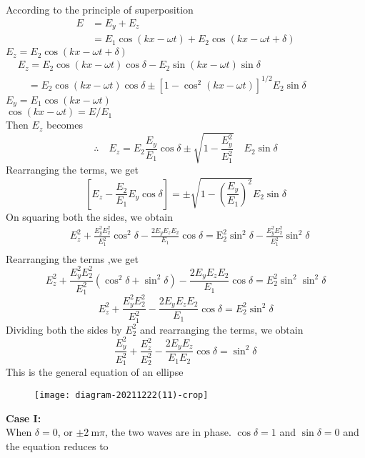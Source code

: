  According to the principle of superposition
 $$
 \begin{aligned}
 E &=E_{y}+E_{z} \\
 &=E_{1} \cos (k x-\omega t)+E_{2} \cos (k x-\omega t+\delta)
 \end{aligned}
 $$
 $E_{z}=E_{2} \cos (k x-\omega t+\delta)$\\
 $\begin{aligned}
 	&E_{z}=E_{2} \cos (k x-\omega t) \cos \delta-E_{2} \sin (k x-\omega t) \sin \delta \\
 	&\quad=E_{2} \cos (k x-\omega t) \cos \delta \pm\left[1-\cos ^{2}(k x-\omega t)\right]^{1 / 2} E_{2} \sin \delta
 \end{aligned}$\\
 $E_{y}=E_{1} \cos (k x-\omega t)$\\
$ \cos (k x-\omega t)=E / E_{1}$\\
Then $E_z$ becomes\\
$$\therefore \quad E_{z}=E_{2} \frac{E_{y}}{E_{1}} \cos \delta \pm \sqrt{1-\frac{E_{y}^{2}}{E_{1}^{2}}} \quad E_{2} \sin \delta$$
Rearranging the terms, we get
$$
\left[E_{z}-\frac{E_{2}}{E_{1}} E_{y} \cos \delta\right]=\pm \sqrt{1-\left(\frac{E_{y}}{E_{1}}\right)^{2}} E_{2} \sin \delta
$$
On squaring both the sides, we obtain
$$
\begin{aligned}
&E_{z}^{2}+\frac{E_{y}^{2} E_{2}^{2}}{E_{1}^{2}} \cos ^{2} \delta-\frac{2 E_{y} E_{z} E_{2}}{E_{1}} \cos \delta=\mathrm{E}_{2}^{2} \sin ^{2} \delta-\frac{E_{y}^{2} E_{2}^{2}}{E_{1}^{2}} \sin ^{2} \delta \\
\end{aligned}
$$
Rearranging the terms ,we get
$$E_z^2+\frac{E_y^2E_2^2}{E_1^2}\left( \cos^2\delta+\sin^2\delta\right) -\frac{2E_yE_zE_2}{E_1}\cos\delta=E_2^2\sin^2\sin^2\delta$$
$$E_{z}^{2}+\frac{E_{y}^{2} E_{2}^{2}}{E_{1}^{2}}-\frac{2 E_{y} E_{z} E_{2}}{E_{1}} \cos \delta=E_{2}^{2} \sin ^{2} \delta$$
Dividing both the sides by $E_{2}^{2}$ and rearranging the terms, we obtain
$$
\frac{E_{y}^{2}}{E_{1}^{2}}+\frac{E_{z}^{2}}{E_{2}^{2}}-\frac{2 E_{y} E_{z}}{E_{1} E_{2}} \cos \delta=\sin ^{2} \delta
$$
This is the general equation of an ellipse\\
\begin{figure}[H]
	\centering
	\texttt{[image: diagram-20211222(11)-crop]}
	\caption{}
	\label{}
\end{figure}
\textbf{Case I:}\\
When $\delta=0$, or $\pm 2 \mathrm{~m} \pi$, the two waves are in phase.
$\cos \delta=1$ and $\sin \delta=0$ and the equation reduces to

